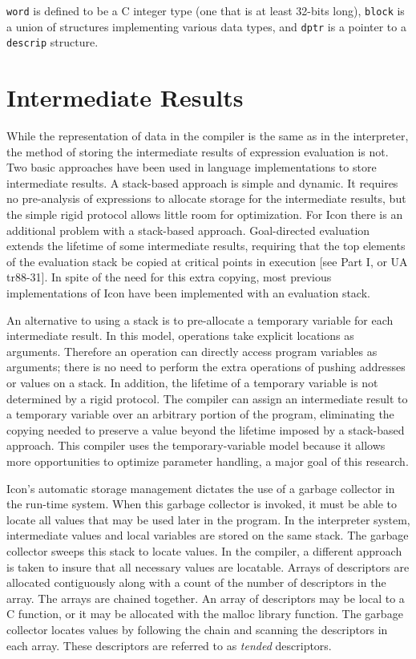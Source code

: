 \noindent
\texttt{word} is defined to be a C integer type (one that is at least
32-bits long), \texttt{block} is a union of structures implementing
various data types, and \texttt{dptr} is a pointer to
a \texttt{descrip} structure.

\section{Intermediate Results}

While the representation of data in the compiler is the same as in the
interpreter, the method of storing the intermediate results of
expression evaluation is not. Two basic approaches have been used in
language implementations to store intermediate results. A stack-based
approach is simple and dynamic. It requires no pre-analysis of
expressions to allocate storage for the intermediate results, but the
simple rigid protocol allows little room for optimization.  For Icon
there is an additional problem with a stack-based
approach. Goal-directed evaluation extends the lifetime of some
intermediate results, requiring that the top elements of the
evaluation stack be copied at critical points in execution [see Part
I, or UA tr88-31]. In spite of the need for this extra copying, most
previous implementations of Icon have been implemented with an
evaluation stack.

An alternative to using a stack is to pre-allocate a temporary
variable for each intermediate result. In this model, operations take
explicit locations as arguments. Therefore an operation can directly
access program variables as arguments; there is no need to perform the
extra operations of pushing addresses or values on a stack. In
addition, the lifetime of a temporary variable is not determined by a
rigid protocol. The compiler can assign an intermediate result to a
temporary variable over an arbitrary portion of the program,
eliminating the copying needed to preserve a value beyond the lifetime
imposed by a stack-based approach. This compiler uses the
temporary-variable model because it allows more opportunities to
optimize parameter handling, a major goal of this research.


Icon's automatic storage management dictates the use of a garbage
collector in the run-time system. When this garbage collector is
invoked, it must be able to locate all values that may be used later
in the program. In the interpreter system, intermediate values and
local variables are stored on the same stack. The garbage collector
sweeps this stack to locate values. In the compiler, a different
approach is taken to insure that all necessary values are locatable.
Arrays of descriptors are allocated contiguously along with a count of
the number of descriptors in the array. The arrays are chained
together. An array of descriptors may be local to a C function, or it
may be allocated with the malloc library function. The garbage
collector locates values by following the chain and scanning the
descriptors in each array. These descriptors are referred to as
\textit{tended} descriptors.

